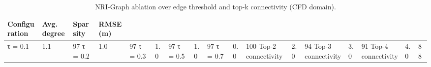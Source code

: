 \begin{table}
\caption{NRI-Graph ablation over edge threshold and top-k connectivity (CFD domain).}
\label{tab:nri-ablation}
\begin{tabular}{llll}
\toprule
Configuration & Avg. degree & Sparsity & RMSE (m) \\
\midrule
τ = 0.1 & 1.1 & 97%
τ = 0.2 & 1.0 & 97%
τ = 0.3 & 1.0 & 97%
τ = 0.5 & 1.0 & 97%
τ = 0.7 & 0.0 & 100%
Top-2 connectivity & 2.0 & 94%
Top-3 connectivity & 3.0 & 91%
Top-4 connectivity & 4.0 & 88%
\bottomrule
\end{tabular}
\end{table}

